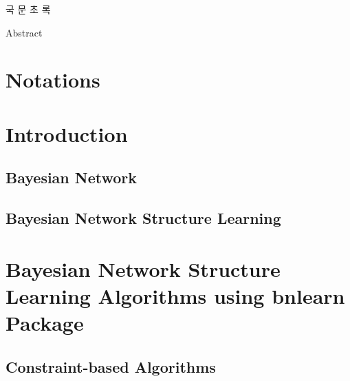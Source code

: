 \documentclass[12pt,a4paper,oneside]{book}
\theoremstyle{plain}
\theoremstyle{definition}
\theoremstyle{remark}
\theoremstyle{definition}
\numberwithin{equation}{chapter}
\begin{document}
\newpage{}

\begin{center}
{\Large 국 문 초 록}
\end{center}




\newpage{}

\begin{center}
{\Large Abstract}
\end{center}

 \tableofcontents
 \newpage
 \listoftables
 \newpage
 \listoffigures

\newpage

 \setcounter{page}{1}

\chapter*{Notations}





\chapter{Introduction}

\section{Bayesian Network}


\section{Bayesian Network Structure Learning}






\chapter{Bayesian Network Structure Learning Algorithms using bnlearn Package}


%
\section{Constraint-based Algorithms}
\end{document}
